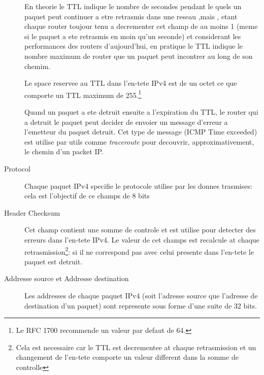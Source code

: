 \documentclass[twoside,openright,a4paper,11pt,french]{article}
\begin{document}
\begin{description}
En theorie le TTL indique le nombre de secondes pendant le quels un paquet
peut continuer a etre retrasmis dans une reseau ,mais , etant chaque router
toujour tenu a decrementer cet champ de au moins 1 (meme si le paquet a ete
retrasmis en moin qu'un seconde) et considerant les performances des routers
d'aujourd'hui, en pratique le TTL indique le nombre maximum de router que
un paquet peut incontrer au long de son chemim.

Le space reservee au TTL dans l'en-tete IPv4 est de un octet ce que comporte un 
TTL maximum de 255.\footnote {Le RFC 1700 recommende un valeur par defaut de 64.}

Quand un paquet a ete detruit ensuite a l'expiration du TTL, le router qui a
detruit le paquet peut decider de envoier un message d'erreur a l'emetteur du
paquet detruit. Cet type de message (ICMP Time exceeded) est utilise par
utils comme {\it traceroute} pour decouvrir, approximativement, le chemin 
d'un packet IP.

\item [Protocol]
Chaque paquet IPv4 specifie le protocole utilise par les donnes trasmises:
cela est l'objectif de ce champs de 8 bits 

\item [Header Checksum]
Cet champ contient une somme de controle et est utilise pour detecter des 
erreurs dans l'en-tete IPv4. Le valeur de cet champs est recalcule at
chaque retrasmission\footnote {Cela est necessaire car le TTL est decrementee
at chaque retrasmission et un changement de l'en-tete comporte un valeur different
dans la somme de controlle}: si il ne correspond pas avec celui 
presente dans l'en-tete le paquet est detruit.


\item [Addresse source et Addresse destination]
Les addresses de chaque paquet IPv4 (soit l'adresse source que l'adresse de
destination d'un paquet) sont represente sous forme d'une suite de 32 bits.


\end{description}
\end{document}
